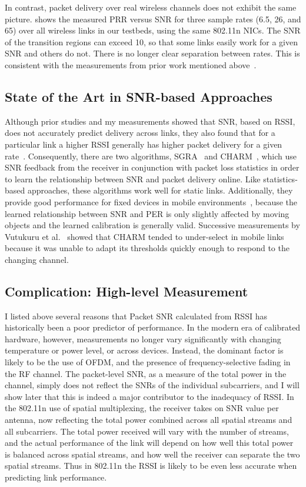 In contrast, packet delivery over real wireless channels does not exhibit the same picture.  shows the measured PRR versus SNR for three sample rates (6.5\Mbps, 26\Mbps, and 65\Mbps) over all wireless links in our testbeds, using the same 802.11n NICs. The SNR of the transition regions can exceed 10\dB, so that some links easily work for a given SNR and others do not. There is no longer clear separation between rates. This is consistent with the measurements from prior work mentioned above~\cite{Aguayo_Roofnet, Judd_CHARM, Reis_interference, Zhang_SNRguided, Zhao_sensys03}.

\subsection{State of the Art in SNR-based Approaches}
Although prior studies and my measurements showed that SNR, based on RSSI, does not accurately predict delivery across links, they also found that for a particular link a higher RSSI generally has higher packet delivery for a given rate~\cite{Aguayo_Roofnet,Judd_CHARM,Zhang_SNRguided}. Consequently, there are two algorithms, SGRA~\cite{Zhang_SNRguided} and CHARM~\cite{Judd_CHARM}, which use SNR feedback from the receiver in conjunction with packet loss statistics in order to learn the relationship between SNR and packet delivery online. Like statistics-based approaches, these algorithms work well for static links. Additionally, they provide good performance for fixed devices in mobile environments~\cite{Judd_CHARM}, because the learned relationship between SNR and PER is only slightly affected by moving objects and the learned calibration is generally valid. Successive measurements by Vutukuru et al.~\cite{Vutukuru_SoftRate} showed that CHARM tended to under-select in mobile links because it was unable to adapt its thresholds quickly enough to respond to the changing channel.

\subsection{Complication: High-level Measurement}
I listed above several reasons that Packet SNR calculated from RSSI has historically been a poor predictor of performance. In the modern era of calibrated hardware, however, measurements no longer vary significantly with changing temperature or power level, or across devices. Instead, the dominant factor is likely to be the use of OFDM, and the presence of frequency-selective fading in the RF channel. The packet-level SNR, as a measure of the total power in the channel, simply does not reflect the SNRs of the individual subcarriers, and I will show later that this is indeed a major contributor to the inadequacy of RSSI. In the 802.11n use of spatial multiplexing, the receiver takes on SNR value per antenna, now reflecting the total power combined across all spatial streams and all subcarriers. The total power received will vary with the number of streams, and the actual performance of the link will depend on how well this total power is balanced across spatial streams, and how well the receiver can separate the two spatial streams. Thus in 802.11n the RSSI is likely to be even less accurate when predicting link performance.

